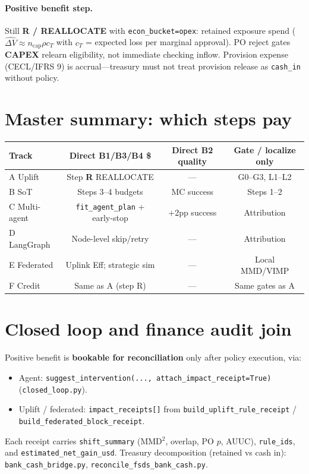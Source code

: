 \documentclass[11pt]{article}
\begin{document}
\paragraph{Positive benefit step.}
Still \textbf{R / REALLOCATE} with \texttt{econ\_bucket=opex}: retained exposure spend
($\widehat{\Delta V} \approx n_{\mathrm{cap}}\rho c_T$ with $c_T$ = expected loss per marginal approval).
PO reject gates \textbf{CAPEX} relearn eligibility, not immediate checking inflow.
Provision expense (CECL/IFRS 9) is accrual---treasury must not treat provision release as \texttt{cash\_in} without policy.

\section{Master summary: which steps pay}

\begin{center}
\small
\begin{tabular}{@{}lccc@{}}
\toprule
Track & Direct B1/B3/B4 \$ & Direct B2 quality & Gate / localize only \\
\midrule
A Uplift & Step \textbf{R} REALLOCATE & --- & G0--G3, L1--L2 \\
B SoT & Steps 3--4 budgets & MC success & Steps 1--2 \\
C Multi-agent & \texttt{fit\_agent\_plan} + early-stop & +2pp success & Attribution \\
D LangGraph & Node-level skip/retry & --- & Attribution \\
E Federated & Uplink Eff; strategic sim & --- & Local MMD/VIMP \\
F Credit & Same as A (step R) & --- & Same gates as A \\
\bottomrule
\end{tabular}
\end{center}

\section{Closed loop and finance audit join}

Positive benefit is \textbf{bookable for reconciliation} only after policy execution, via:
\begin{itemize}[nosep]
  \item Agent: \texttt{suggest\_intervention(..., attach\_impact\_receipt=True)} (\texttt{closed\_loop.py}).
  \item Uplift / federated: \texttt{impact\_receipts[]} from \texttt{build\_uplift\_rule\_receipt} / \texttt{build\_federated\_block\_receipt}.
\end{itemize}
Each receipt carries \texttt{shift\_summary} (MMD$^2$, overlap, PO $p$, AUUC), \texttt{rule\_ids}, and \texttt{estimated\_net\_gain\_usd}.
Treasury decomposition (retained vs cash in): \texttt{bank\_cash\_bridge.py}, \texttt{reconcile\_fsds\_bank\_cash.py}.
\end{document}
